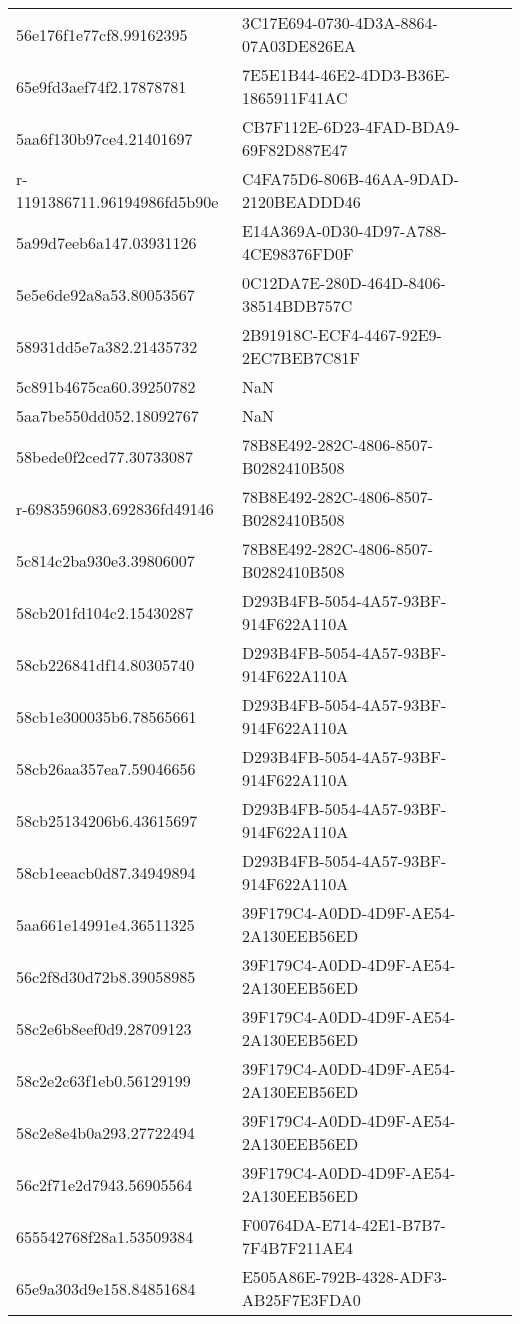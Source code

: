 \begin{tabular}{ll}
56e176f1e77cf8.99162395 & 3C17E694-0730-4D3A-8864-07A03DE826EA \\
65e9fd3aef74f2.17878781 & 7E5E1B44-46E2-4DD3-B36E-1865911F41AC \\
5aa6f130b97ce4.21401697 & CB7F112E-6D23-4FAD-BDA9-69F82D887E47 \\
r-1191386711.96194986fd5b90e & C4FA75D6-806B-46AA-9DAD-2120BEADDD46 \\
5a99d7eeb6a147.03931126 & E14A369A-0D30-4D97-A788-4CE98376FD0F \\
5e5e6de92a8a53.80053567 & 0C12DA7E-280D-464D-8406-38514BDB757C \\
58931dd5e7a382.21435732 & 2B91918C-ECF4-4467-92E9-2EC7BEB7C81F \\
5c891b4675ca60.39250782 & NaN \\
5aa7be550dd052.18092767 & NaN \\
58bede0f2ced77.30733087 & 78B8E492-282C-4806-8507-B0282410B508 \\
r-6983596083.692836fd49146 & 78B8E492-282C-4806-8507-B0282410B508 \\
5c814c2ba930e3.39806007 & 78B8E492-282C-4806-8507-B0282410B508 \\
58cb201fd104c2.15430287 & D293B4FB-5054-4A57-93BF-914F622A110A \\
58cb226841df14.80305740 & D293B4FB-5054-4A57-93BF-914F622A110A \\
58cb1e300035b6.78565661 & D293B4FB-5054-4A57-93BF-914F622A110A \\
58cb26aa357ea7.59046656 & D293B4FB-5054-4A57-93BF-914F622A110A \\
58cb25134206b6.43615697 & D293B4FB-5054-4A57-93BF-914F622A110A \\
58cb1eeacb0d87.34949894 & D293B4FB-5054-4A57-93BF-914F622A110A \\
5aa661e14991e4.36511325 & 39F179C4-A0DD-4D9F-AE54-2A130EEB56ED \\
56c2f8d30d72b8.39058985 & 39F179C4-A0DD-4D9F-AE54-2A130EEB56ED \\
58c2e6b8eef0d9.28709123 & 39F179C4-A0DD-4D9F-AE54-2A130EEB56ED \\
58c2e2c63f1eb0.56129199 & 39F179C4-A0DD-4D9F-AE54-2A130EEB56ED \\
58c2e8e4b0a293.27722494 & 39F179C4-A0DD-4D9F-AE54-2A130EEB56ED \\
56c2f71e2d7943.56905564 & 39F179C4-A0DD-4D9F-AE54-2A130EEB56ED \\
655542768f28a1.53509384 & F00764DA-E714-42E1-B7B7-7F4B7F211AE4 \\
65e9a303d9e158.84851684 & E505A86E-792B-4328-ADF3-AB25F7E3FDA0 \\

\end{tabular}
